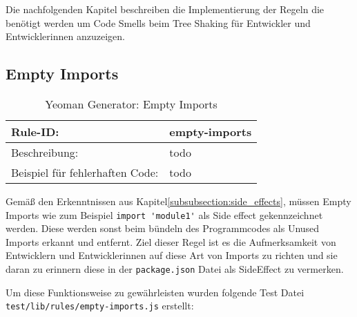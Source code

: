Die nachfolgenden Kapitel beschreiben die Implementierung der Regeln die benötigt werden um Code Smells beim Tree Shaking für Entwickler und Entwicklerinnen anzuzeigen.

\subsection{Empty Imports}

\begin{table}[h]
\centering
\caption{Yeoman Generator: Empty Imports}
\label{tbl:empty_imports}
\begin{tabular}{|l|l|}
\hline
Rule-ID: & empty-imports \\ \hline
Beschreibung: & todo \\ \hline
Beispiel für fehlerhaften Code: & todo \\ \hline
\end{tabular}
\end{table}

Gemäß den Erkenntnissen aus  Kapitel\ref{subsubsection:side_effects}, müssen Empty Imports wie zum Beispiel \lstinline{import 'module1'} als Side effect gekennzeichnet werden. Diese werden sonst beim bündeln des Programmcodes als Unused Imports erkannt und entfernt. Ziel dieser Regel ist es die Aufmerksamkeit von Entwicklern und Entwicklerinnen auf diese Art von Imports zu richten und sie daran zu erinnern diese in der  \lstinline{package.json} Datei als SideEffect zu vermerken.

Um diese Funktionsweise zu gewährleisten wurden folgende Test Datei \lstinline{test/lib/rules/empty-imports.js} erstellt: 

